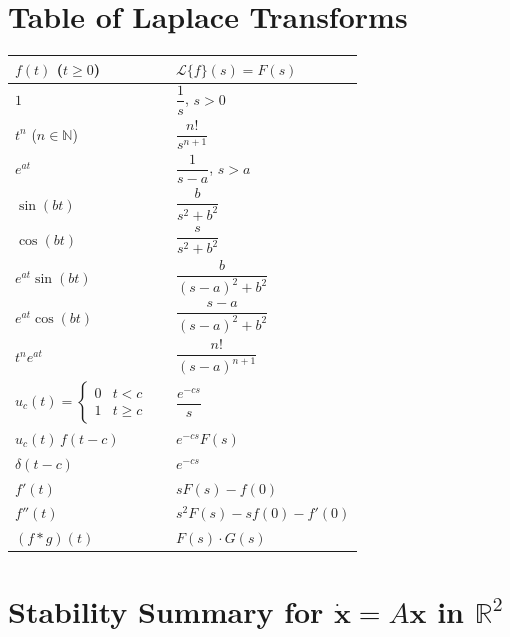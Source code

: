 \documentclass[12pt,a4paper,openany]{book}
\theoremstyle{definition}
\theoremstyle{plain}
\theoremstyle{remark}
\newcommand{\R}{\mathbb{R}}
\newcommand{\N}{\mathbb{N}}
\begin{document}
\section*{Table of Laplace Transforms}

\begin{center}
\begin{tabular}{@{}lcl@{}}
\toprule
$f(t)$ \quad ($t\ge 0$) & \qquad & $\mathcal{L}\{f\}(s)=F(s)$ \\
\midrule
$1$ && $\dfrac{1}{s}$, \; $s>0$ \\[8pt]
$t^{n}$ \; ($n\in\N$) && $\dfrac{n!}{s^{n+1}}$ \\[8pt]
$e^{at}$ && $\dfrac{1}{s-a}$, \; $s>a$ \\[8pt]
$\sin(bt)$ && $\dfrac{b}{s^{2}+b^{2}}$ \\[8pt]
$\cos(bt)$ && $\dfrac{s}{s^{2}+b^{2}}$ \\[8pt]
$e^{at}\sin(bt)$ && $\dfrac{b}{(s-a)^{2}+b^{2}}$ \\[8pt]
$e^{at}\cos(bt)$ && $\dfrac{s-a}{(s-a)^{2}+b^{2}}$ \\[8pt]
$t^{n}e^{at}$ && $\dfrac{n!}{(s-a)^{n+1}}$ \\[8pt]
$u_{c}(t)=\begin{cases}0&t<c\\1&t\ge c\end{cases}$ &&
  $\dfrac{e^{-cs}}{s}$ \\[8pt]
$u_{c}(t)\,f(t-c)$ && $e^{-cs}F(s)$ \\[8pt]
$\delta(t-c)$ && $e^{-cs}$ \\[8pt]
$f'(t)$ && $sF(s)-f(0)$ \\[8pt]
$f''(t)$ && $s^{2}F(s)-sf(0)-f'(0)$ \\[8pt]
$(f*g)(t)$ && $F(s)\cdot G(s)$ \\
\bottomrule
\end{tabular}
\end{center}

\section*{Stability Summary for $\dot{\mathbf{x}}=A\mathbf{x}$ in $\R^{2}$}
\end{document}
